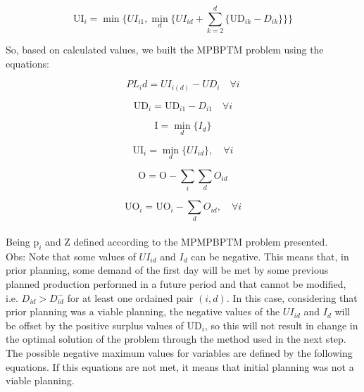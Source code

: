 \documentclass[authoryear,preprint,12pt]{elsarticle}
\begin{document}
\begin{equation}
	\textrm{UI}_{i} = \min\{UI_{i1}, \min_d\{UI_{id} + \sum_{k=2}^{d}\{\textrm{UD}_{ik} - D_{ik}\}\}\}
\end{equation}
 

So, based on calculated values, we built the MPBPTM problem using the equations:

\begin{equation}
PL_id = UI_{i(d)} - UD_{i} \quad \forall i
\end{equation}

\begin{equation}
\textrm{UD}_{i} = \textrm{UD}_{i1} - D_{i1} \quad \forall i
\end{equation}

\begin{equation}
\textrm{I} = \min_{d} \{I_{d}\}
\end{equation}

\begin{equation}
\textrm{UI}_{i} = \min_{d} \{UI_{id}\}, \quad \forall{i}
\end{equation}

\begin{equation}
\textrm{O} = \textrm{O} - \sum_{i}{\sum_{d}{O_{id}}}
\end{equation}

\begin{equation}
\textrm{UO}_{i} = \textrm{UO}_{i} - \sum_{d}{O_{id}}, \quad \forall i
\end{equation} \\

Being $\textrm{p}_{i}$ and $\textrm{Z}$ defined according to the MPMPBPTM problem presented. \\

Obs: Note that some values of $UI_{id}$ and  $I_{d}$ can be negative. This means that, in prior planning, some demand of the first day will be met by some previous planned production performed in a future period and that cannot be modified, i.e. $D_{id} > D_{id}^-$ for at least one ordained pair $(i,d)$. In this case, considering that prior planning was a viable planning, the negative values of the $UI_{id}$ and $I_{d}$ will be offset by the positive surplus values of $\textrm{UD}_{i}$, so this will not result in change in the optimal solution of the problem through the method used in the next step. \\

The possible negative maximum values for variables are defined by the following equations. If this equations are not met, it means that initial planning was not a viable planning.
\end{document}
